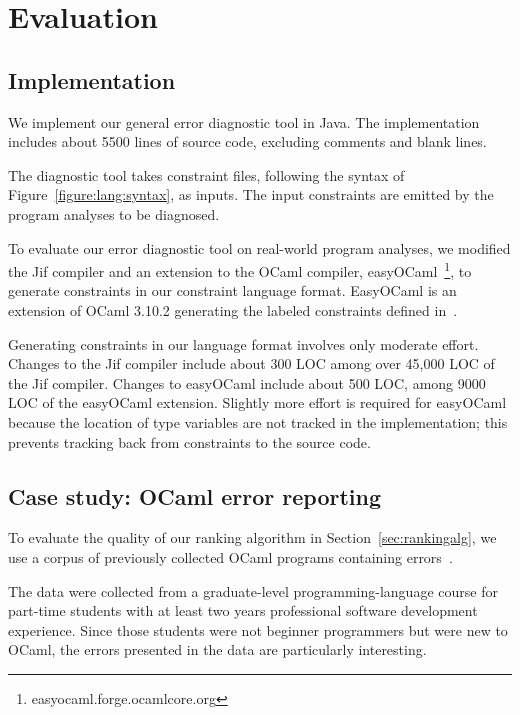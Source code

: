 
\section{Evaluation}
\label{sec:evaluation}

\subsection{Implementation}

We implement our general error diagnostic tool in Java. The
implementation includes about 5500 lines of source code, excluding
comments and blank lines.

The diagnostic tool takes constraint files, following the syntax of
Figure~\ref{figure:lang:syntax}, as inputs. The input constraints are
emitted by the program analyses to be diagnosed.

To evaluate our error diagnostic tool on real-world program analyses,
we modified the Jif compiler and an extension to the OCaml compiler,
easyOCaml~\footnote{easyocaml.forge.ocamlcore.org}, to generate
constraints in our constraint language format. EasyOCaml is an
extension of OCaml 3.10.2 generating the labeled constraints defined
in~\cite{haack:slicing}.

Generating constraints in our language format involves only moderate
effort. Changes to the Jif compiler include about 300 LOC among
over 45,000 LOC of the Jif compiler. Changes to easyOCaml include about
500 LOC, among 9000 LOC of the easyOCaml extension.  Slightly more
effort is required for easyOCaml because the location of type
variables are not tracked in the implementation; this prevents
tracking back from constraints to the source code.

\subsection{Case study: OCaml error reporting}
\label{sec:ocamleval}

To evaluate the quality of our ranking algorithm in
Section~\ref{sec:rankingalg}, we use a corpus of previously collected
OCaml programs containing errors~\cite{lerner:pldi07}.

The data were collected from a graduate-level programming-language
course for part-time students with at least two years professional
software development experience. Since those students were not
beginner programmers but were new to OCaml, the errors presented in
the data are particularly interesting.


